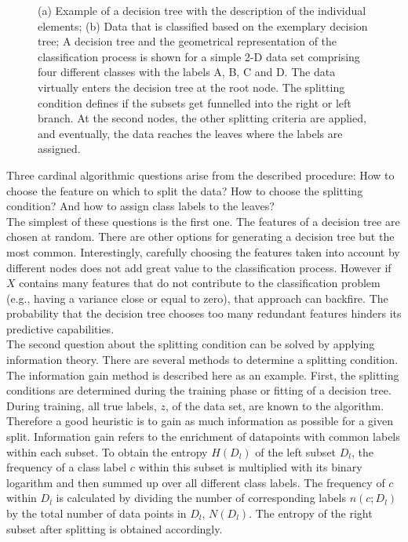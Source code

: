\begin{figure}[H]
\begin{subfigure}[c]{0.45\textwidth}
		\label{fig:decisiontreegraphb}
		\subcaption{}
	\end{subfigure}
	\caption[Visual Explanation of Decision Trees]{(a) Example of a decision tree with the description of the individual elements; (b) Data that is classified based on the exemplary decision tree; A decision tree and the geometrical representation of the classification process is shown for a simple 2-D data set comprising four different classes with the labels A, B, C and D. The data virtually enters the decision tree at the root node. The splitting condition defines if the subsets get funnelled into the right or left branch. At the second nodes, the other splitting criteria are applied, and eventually, the data reaches the leaves where the labels are assigned.\cite{Forsyth2019}}
	\label{fig:decisiontreegraph}
\end{figure}\noindent
Three cardinal algorithmic questions arise from the described procedure: How to choose the feature on which to split the data? How to choose the splitting condition? And how to assign class labels to the leaves?\cite{Forsyth2019}\\
The simplest of these questions is the first one. The features of a decision tree are chosen at random. There are other options for generating a decision tree but the most common. Interestingly, carefully choosing the features taken into account by different nodes does not add great value to the classification process. \cite{Forsyth2019} However if $X$ contains many features that do not contribute to the classification problem (e.g., having a variance close or equal to zero), that approach can backfire. The probability that the decision tree chooses too many redundant features hinders its predictive capabilities.\cite{Forsyth2019}\\
The second question about the splitting condition can be solved by applying information theory. There are several methods to determine a splitting condition. The information gain method is described here as an example. First, the splitting conditions are determined during the training phase or fitting of a decision tree. During training, all true labels, $z$, of the data set, are known to the algorithm. Therefore a good heuristic is to gain as much information as possible for a given split. Information gain refers to the enrichment of datapoints with common labels within each subset. To obtain the entropy $H(D_{l})$ of the left subset $D_{l}$, the frequency of a class label $c$ within this subset is multiplied with its binary logarithm and then summed up over all different class labels. The frequency of $c$ within $D_{l}$ is calculated by dividing the number of corresponding labels $n(c;D_{l})$ by the total number of data points in $D_{l}$, $N(D_l)$. The entropy of the right subset after splitting is obtained accordingly.\cite{Forsyth2019}
